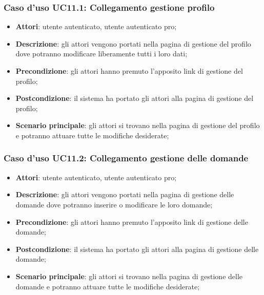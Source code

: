 \subsubsection{Caso d'uso UC11.1: Collegamento gestione profilo}
\begin{itemize}
\item\textbf{Attori}: utente autenticato, utente autenticato pro;
\item\textbf{Descrizione}: gli attori vengono portati nella pagina di gestione del profilo dove potranno modificare liberamente tutti i loro dati;
\item\textbf{Precondizione}: gli attori hanno premuto l'apposito link di gestione del profilo;
\item\textbf{Postcondizione}: il sistema ha portato gli attori alla pagina di gestione del profilo;
\item\textbf{Scenario principale}: gli attori si trovano nella pagina di gestione del profilo e potranno attuare tutte le modifiche desiderate;
\end{itemize}

\subsubsection{Caso d'uso UC11.2: Collegamento gestione delle domande}
\begin{itemize}
\item\textbf{Attori}: utente autenticato, utente autenticato pro;
\item\textbf{Descrizione}: gli attori vengono portati nella pagina di gestione delle domande dove potranno inserire o modificare le loro domande;
\item\textbf{Precondizione}: gli attori hanno premuto l'apposito link di gestione delle domande;
\item\textbf{Postcondizione}: il sistema ha portato gli attori alla pagina di gestione delle domande;
\item\textbf{Scenario principale}: gli attori si trovano nella pagina di gestione delle domande e potranno attuare tutte le modifiche desiderate;
\end{itemize}

